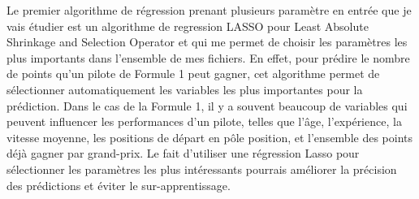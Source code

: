 Le premier algorithme de régression prenant plusieurs paramètre en entrée que je vais étudier est un algorithme de regression LASSO pour Least Absolute Shrinkage and Selection Operator et qui me permet de choisir les paramètres les plus importants dans l'ensemble de mes fichiers. En effet, pour prédire le nombre de points qu'un pilote de Formule 1 peut gagner, cet algorithme permet de sélectionner automatiquement les variables les plus importantes pour la prédiction. Dans le cas de la Formule 1, il y a souvent beaucoup de variables qui peuvent influencer les performances d'un pilote, telles que l'âge, l'expérience, la vitesse moyenne, les positions de départ en pôle position, et l'ensemble des points déjà gagner par grand-prix. Le fait d'utiliser une régression Lasso pour sélectionner les paramètres les plus intéressants pourrais améliorer la précision des prédictions et éviter le sur-apprentissage.

